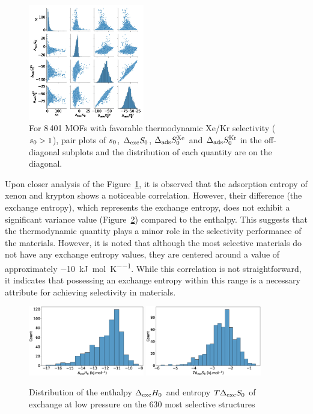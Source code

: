 \documentclass[main.tex]{subfiles}
\begin{document}
\begin{figure}[h]
  \centering
    \includegraphics[width=0.45\textwidth]{figures/2-thermo/Entropy_0.jpg}
    \caption{For 8\,401 MOFs with favorable thermodynamic Xe/Kr selectivity ($s_{\text{0}} > 1$), pair plots of $s_{\text{0}}$, $\Delta_{\text{exc}}S_{\text{0}}$, $\Delta_{\text{ads}}S^{\text{Xe}}_{\text{0}}$ and $\Delta_{\text{ads}}S^{\text{Kr}}_{\text{0}}$ in the off-diagonal subplots and the distribution of each quantity are on the diagonal.}\label{fgr:SI:HS_0_log}
\end{figure}

Upon closer analysis of the Figure~\ref{fgr:SI:HS_0_log}, it is observed that the adsorption entropy of xenon and krypton shows a noticeable correlation. However, their difference (the exchange entropy), which represents the exchange entropy, does not exhibit a significant variance value (Figure~\ref{fgr:SI:dist0}) compared to the enthalpy. This suggests that the thermodynamic quantity plays a minor role in the selectivity performance of the materials. However, it is noted that although the most selective materials do not have any exchange entropy values, they are centered around a value of approximately \SI{-10}{\kilo\joule\per\mole\per\kelvin}. While this correlation is not straightforward, it indicates that possessing an exchange entropy within this range is a necessary attribute for achieving selectivity in materials.

\begin{figure}[ht]
  \centering
    \includegraphics[width=0.45\textwidth]{figures/2-thermo/Delta_H_0.jpg}
    \includegraphics[width=0.45\textwidth]{figures/2-thermo/T_Delta_S_0.jpg}
    \caption{Distribution of the enthalpy $\Delta_{\text{exc}}H_{\text{0}}$ and entropy $T\Delta_{\text{exc}}S_{\text{0}}$ of exchange at low pressure on the 630 most selective structures}\label{fgr:SI:dist0}
\end{figure}
\end{document}
